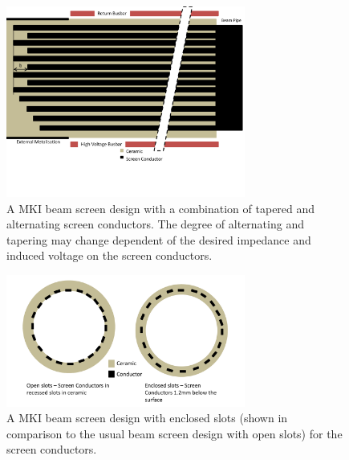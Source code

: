 \begin{figure}
\begin{center}
\includegraphics[width=0.7\textwidth]{LHC_MKI/figures/mki-design-layouts/combination_layout.pdf}
\end{center}
\label{fig:24-alternating-tapered}
\caption{A MKI beam screen design with a combination of tapered and alternating screen conductors. The degree of alternating and tapering may change dependent of the desired impedance and induced voltage on the screen conductors.}
\end{figure}

\begin{figure}
\begin{center}
\includegraphics[width=0.7\textwidth]{LHC_MKI/figures/mki-design-layouts/enclosed_diagram.pdf}
\end{center}
\label{fig:24-enclosed-slots}
\caption{A MKI beam screen design with enclosed slots (shown in comparison to the usual beam screen design with open slots) for the screen conductors.}
\end{figure}

